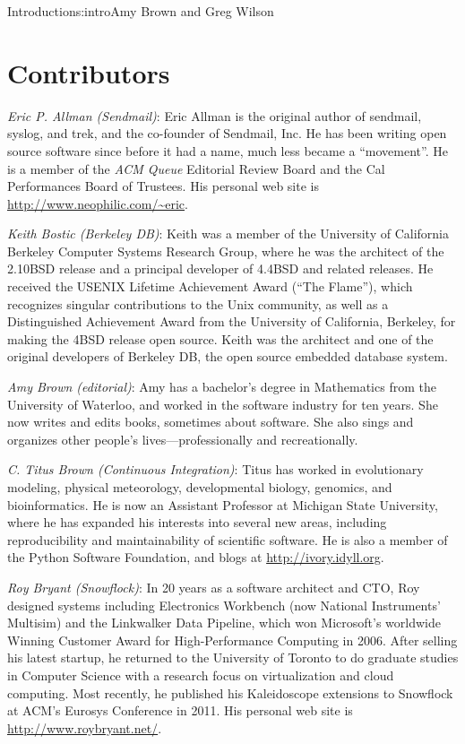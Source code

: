 \begin{aosachapter}{Introduction}{s:intro}{Amy Brown and Greg Wilson}
\section*{Contributors}

\indent \indent \emph{Eric P\@. Allman (Sendmail)}: Eric Allman is the
original author of sendmail, syslog, and trek, and the co-founder
of Sendmail, Inc.  He has been writing open source software since
before it had a name, much less became a ``movement''.  He is a
member of the \emph{ACM Queue} Editorial Review Board and the Cal
Performances Board of Trustees.  His personal web site
is \url{http://www.neophilic.com/~eric}.

\pagebreak

\emph{Keith Bostic (Berkeley DB)}: Keith was a member of the University
of California Berkeley Computer Systems Research Group, where he was the
architect of the 2.10BSD release and a principal developer of 4.4BSD and
related releases.  He received the USENIX Lifetime Achievement Award (``The
Flame''), which recognizes singular contributions to the Unix community, as well
as a Distinguished Achievement Award from the University of California,
Berkeley, for making the 4BSD release open source.  Keith was the
architect and one of the original developers of Berkeley DB, the open source
embedded database system.  

\emph{Amy Brown (editorial)}: Amy has a bachelor's degree in Mathematics
from the University of Waterloo, and worked in the software industry for ten
years.  She now writes and edits books, sometimes about software. She also
sings and organizes other people's lives---professionally and recreationally.

\emph{C. Titus Brown (Continuous Integration)}: Titus has worked in
evolutionary modeling, physical meteorology, developmental biology, genomics,
and bioinformatics. He is now an Assistant Professor at Michigan State
University, where he has expanded his interests into several new areas,
including reproducibility and maintainability of scientific software. He is
also a member of the Python Software Foundation, and blogs at
\url{http://ivory.idyll.org}.

\emph{Roy Bryant (Snowflock)}: In 20 years as a software
architect and CTO, Roy designed systems including Electronics
Workbench (now National Instruments' Multisim) and the Linkwalker
Data Pipeline, which won Microsoft's worldwide Winning Customer
Award for High-Performance Computing in 2006. After selling his
latest startup, he returned to the University of Toronto to do
graduate studies in Computer Science with a research focus on
virtualization and cloud computing. Most recently, he published
his Kaleidoscope extensions to Snowflock at ACM's Eurosys
Conference in 2011.  His personal web site
is \url{http://www.roybryant.net/}.


\end{aosachapter}
